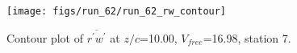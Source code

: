 \begin{figure}[H]
\centering
\texttt{[image: figs/run\_62/run\_62\_rw\_contour]}
\caption{Contour plot of $\overline{r^\prime w^\prime}$ at $z/c$=10.00, $V_{free}$=16.98, station 7.}
\label{fig:run_62_rw_contour}
\end{figure}


